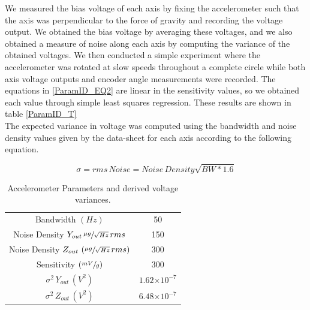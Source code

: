 \documentclass{article}
\theoremstyle{plain}
\theoremstyle{definition}
\theoremstyle{remark}
\providecommand{\e}[1]{\ensuremath{\times 10^{#1}}}
\begin{document}
We measured the bias voltage of each axis by fixing the accelerometer such that the axis was perpendicular to the force of gravity and recording the voltage output.  We obtained the bias voltage by averaging these voltages, and we also obtained a measure of noise along each axis by computing the variance of the obtained voltages.  We then conducted a simple experiment where the accelerometer was rotated at slow speeds throughout a complete circle while both axis voltage outputs and encoder angle measurements were recorded.  The equations in \ref{ParamID_EQ2} are linear in the sensitivity values, so we obtained each value through simple least squares regression.  These results are shown in table \ref{ParamID_T} \\

The expected variance in voltage was computed using the bandwidth and noise density values given by the data-sheet for each axis according to the following equation.


$$\sigma = rms \, Noise = Noise \, Density \sqrt{BW * 1.6} $$

\begin{table}
\begin{center}
	\begin{tabular}{|c|c|}
		\hline
		Bandwidth $(Hz)$ & 50 \\ 
		Noise Density $Y_{out} \, \sfrac{\mu g}{\sqrt{Hz}} \, rms$ & 150 \\ 
		Noise Density $Z_{out} \, \left(\sfrac{\mu g}{\sqrt{Hz}} \, rms\right)$ & 300 \\ 
		Sensitivity $\left( \sfrac{mV}{g} \right)$ & 300 \\  
		$\sigma^2 \,Y_{out} \, (V^2)$ & $1.62 \e{-7}$ \\ 
		$\sigma^2 \,Z_{out} \, (V^2)$ & $6.48 \e{-7}$ \\[0.1cm] \hline
		
	\end{tabular}
\caption{Accelerometer Parameters and derived voltage variances.}
\label{ParamID_AccelT}
\end{center}
\end{table}
\end{document}
